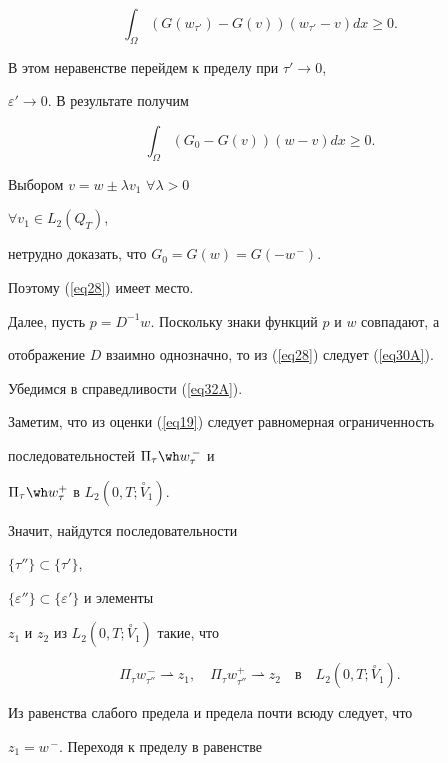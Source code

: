 $$


\int_{\Omega} (G(w_{\tau'})-G(v))(w_{\tau'}-v) dx \geq 0.


$$


В этом неравенстве перейдем к пределу при $\tau' \to 0$,


$\varepsilon' \to 0$. В результате получим


$$


\int_{\Omega} (G_{0}-G(v))(w-v) dx \geq 0.


$$


Выбором $v=w \pm \lambda v_{1}$ $\forall \lambda >0$


$\forall v_{1} \in L_{2}(Q_{T})$,


нетрудно доказать, что $G_{0}=G(w)=G(-w^{\,-})$.


Поэтому (\ref{eq28}) имеет место.





Далее, пусть $p=D^{-1}w$. Поскольку знаки функций $p$ и $w$ совпадают, а


отображение $D$ взаимно однозначно, то из (\ref{eq28}) следует (\ref{eq30A}).





Убедимся в справедливости (\ref{eq32A}).


Заметим, что из оценки (\ref{eq19}) следует равномерная ограниченность


последовательностей $\Pi_{\tau} \wh w_{\tau}^{\,-}$ и


$\Pi_{\tau} \wh w_{\tau}^{+}$ в $L_{2}(0,T; \overset{\circ}{V}_{1})$.


Значит, найдутся последовательности


$\{\tau'' \} \subset \{\tau' \}$,


$\{\varepsilon'' \} \subset \{\varepsilon' \}$ и элементы


$z_{1}$ и $z_{2}$ из $L_{2}(0,T; \overset{\circ}{V}_{1})$ такие, что


$$


\Pi_{\tau} w_{\tau''}^{\,-} \rightharpoonup z_{1},\quad


\Pi_{\tau} w_{\tau''}^{+} \rightharpoonup z_{2}


\quad \text{в} \quad L_{2}(0,T; \overset{\circ}{V}_{1}).


$$


Из равенства слабого предела и предела почти всюду следует, что


$z_{1}=w^{\,-}$. Переходя к пределу в равенстве


